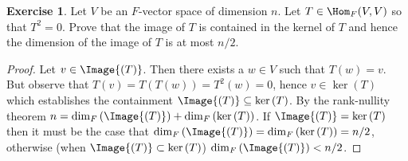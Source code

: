 \documentclass[10pt,twoside,openany]{memoir}
\theoremstyle{plain}
\theoremstyle{definition}
\newtheorem{exercise}{Exercise}
\theoremstyle{remark}
\numberwithin{equation}{section}
\renewcommand{\geq}{\geqslant}
\begin{document}
    \addtocounter{exercise}{4}
    \vspace{10pt}
    \begin{exercise}
        Let $V$ be an $F$-vector space of dimension $n$. Let $T \in \Hom_F{(V,V)}$ so that $T^2 = 0$. Prove that the image of $T$ is contained in the kernel of $T$ and hence the dimension of the image of $T$ is at most $n/2$.
    \end{exercise}
        \begin{proof}
            Let $v \in \Image{(T)}$. Then there exists a $w \in V$ such that $T(w) = v$. But observe that $T(v) = T(T(w)) = T^2(w) = 0$, hence $v \in \ker{(T)}$ which establishes the containment $\Image{(T)} \subseteq \ker{(T)}$. By the rank-nullity theorem $n = \dim_F{(\Image{(T)})} + \dim_F{(\ker{(T)})}$. If $\Image{(T)} = \ker{(T)}$ then it must be the case that $\dim_F{(\Image{(T)})} = \dim_F{(\ker{(T)})} = n/2$, otherwise (when $\Image{(T)} \subset \ker{(T)}$) $\dim_F{(\Image{(T)})} < n/2$.
        \end{proof}
    \begin{comment}
    \begin{exercise}
        Let $T \in \Hom_F{(V,V)}$.
            \begin{enumerate}[label = (\alph*)]
                \item Give an example to show that one does not always have $V \cong \ker{(T)} \oplus \Image{(T)}$.
                \item Show that $\ker{(T^j)} \subset \ker{(T^{j+1})}$ for all $j \geq 1$. Prove that this sequence stabilizes; i.e., there exists $m \geq 1$ so that $\ker{(T^{m+j})} = \ker{(T^m)}$ for all $j \geq 1$. The subspace $\ker{(T^m)}$ is called the \textui{eventual kernel} and denoted $\ker{(T^\infty)}$.
                \item Show that $\Image{(T^{j})} \supset \Image{(T^{j+1})}$ for all $j \geq 1$. Prove that this sequence stabilizes; i.e., there exists $m \geq 1$ so that $\Image{(T^{m+j})} = \Image{(T^{m})}$ for all $j \geq 1$. The subspace $\Image{(T^{m})}$ is called the \textui{eventual image} and denoted $\Image{(T^{\infty})}$.
                \item Prove that $V \cong \ker{(T^\infty)} \oplus \Image{(T^\infty)}$.
            \end{enumerate}
    \end{exercise}
    \end{comment}
\end{document}

